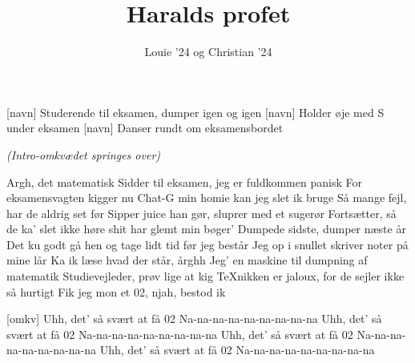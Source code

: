 \documentclass[a4paper,11pt]{article}
\title{Haralds profet}
\author{Louie '24 og Christian '24}
\begin{document}
\maketitle

\begin{roles}
[navn] Studerende til eksamen, dumper igen og igen
[navn] Holder øje med S under eksamen
[navn] Danser rundt om eksamensbordet
\end{roles}


\begin{song}
  {\it (Intro-omkvædet springes over)}

   Argh, det matematisk
  Sidder til eksamen, jeg er fuldkommen panisk
  For eksamensvagten kigger nu
  Chat-G min homie kan jeg slet ik bruge
  Så mange fejl, har de aldrig set før
  Sipper juice han gør, sluprer med et sugerør
  Fortsætter, så de ka' slet ikke høre
  shit har glemt min bøger'
  Dumpede sidste, dumper næste år
  Det ku godt gå hen og tage lidt tid før jeg består
  Jeg op i snullet skriver noter på mine lår
  Ka ik læse hvad der står, årghh
  Jeg' en maskine til dumpning af matematik
  Studievejleder, prøv lige at kig
  TeXnikken er jaloux, for de sejler ikke så hurtigt
  Fik jeg mon et 02, njah, bestod ik

  [omkv] Uhh, det' så svært at få 02
  Na-na-na-na-na-na-na-na-na
  Uhh, det' så svært at få 02
  Na-na-na-na-na-na-na-na-na
  Uhh, det' så svært at få 02
  Na-na-na-na-na-na-na-na-na
  Uhh, det' så svært at få 02
  Na-na-na-na-na-na-na-na-na
\end{song}
\end{document}
